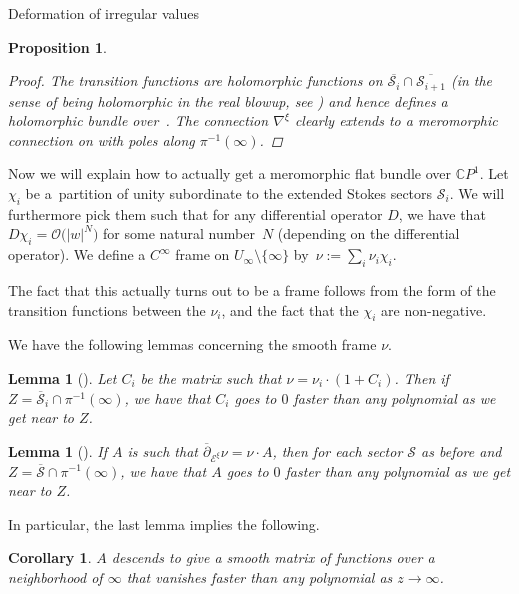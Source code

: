 \documentclass[11pt]{article}
\numberwithin{equation}{section}
\newtheorem{Corollary}[Theorem]{Corollary}
\newtheorem{Lemma}[Theorem]{Lemma}
\newtheorem{Proposition}[Theorem]{Proposition}
 { \theoremstyle{definition}
\newtheorem{Definition}[Theorem]{Definition}
\newtheorem{Notation}[Theorem]{Notation}
\newtheorem{Example}[Theorem]{Example}
\newtheorem{Remark}[Theorem]{Remark} }
\numberwithin{equation}{section}
\newcommand{\CP}{\mathbb{C}P^1}
\begin{document}
\begin{subsubsection}{Deformation of irregular values}
\begin{Proposition}
\begin{proof}
The transition functions are holomorphic functions on $\overline{\mathcal{S}_i}\cap \overline{\mathcal{S}_{i+1}}$ (in the sense of being holomorphic in the real blowup, see \cite[Section 3.1.3]{M}) and hence defines a holomorphic bundle over~\smash{$\widetilde{\CP}(\infty)$}. The connection $\nabla^{\xi}$ clearly extends to a meromorphic connection on \smash{$\widetilde{\CP}(\infty)$} with poles along $\pi^{-1}(\infty)$.
\end{proof}

\end{Proposition}

Now we will explain how to actually get a meromorphic flat bundle over $\CP$. Let $\chi_{i}$ be a~partition of unity subordinate to the extended Stokes sectors $\mathcal{S}_i$. We will furthermore pick them such that for any differential operator $D$, we have that $D\chi_{i}=\mathcal{O}\bigl(|w|^{N}\bigr)$ for some natural number~$N$ (depending on the differential operator). We define a $C^{\infty}$ frame on $U_{\infty}\setminus \{\infty\}$ by~$
 \nu:=\sum_i \nu_{i}\chi_{i}$.

The fact that this actually turns out to be a frame follows from the form of the transition functions between the $\nu_{i}$, and the fact that the $\chi_{i}$ are non-negative.

We have the following lemmas concerning the smooth frame $\nu$.

\begin{Lemma}[{\cite[Lemma 3.1.15]{M}}] Let $C_i$ be the matrix such that $\nu=\nu_i\cdot(1+C_i)$. Then if~$Z=\overline{\mathcal{S}}_i\cap \pi^{-1}(\infty)$, we have that $C_i$ goes to $0$ faster than any polynomial as we get near to $Z$.

\end{Lemma}

\begin{Lemma}[{\cite[Lemma 3.1.16]{M}}] If $A$ is such that $\overline{\partial}_{\mathcal{E}^{\xi}}\nu=\nu \cdot A$, then for each sector $\mathcal{S}$ as before and $Z=\overline{\mathcal{S}}\cap \pi^{-1}(\infty)$, we have that $A$ goes to $0$ faster than any polynomial as we get near to $Z$.

\end{Lemma}
In particular, the last lemma implies the following.

\begin{Corollary}\label{exthol}
$A$ descends to give a smooth matrix of functions over a neighborhood of $\infty$ that vanishes faster than any polynomial as $z\to \infty$.
\end{Corollary}


\end{subsubsection}
\end{document}

